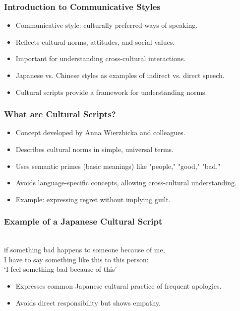 \documentclass[xetex]{beamer}
\begin{document}
\begin{frame}
\frametitle{Introduction to Communicative Styles}
\begin{itemize}
    \item Communicative style: culturally preferred ways of speaking.
    \item Reflects cultural norms, attitudes, and social values.
    \item Important for understanding cross-cultural interactions.
    \item Japanese vs. Chinese styles as examples of indirect vs. direct speech.
    \item Cultural scripts provide a framework for understanding norms.
\end{itemize}
\end{frame}

\begin{frame}
\frametitle{What are Cultural Scripts?}
\begin{itemize}
    \item Concept developed by Anna Wierzbicka and colleagues.
    \item Describes cultural norms in simple, universal terms.
    \item Uses semantic primes (basic meanings) like "people," "good," "bad."
    \item Avoids language-specific concepts, allowing cross-cultural understanding.
    \item Example: expressing regret without implying guilt.
\end{itemize}
\end{frame}

\begin{frame}
\frametitle{Example of a Japanese Cultural Script}
\begin{exe}
     \\
    if something bad happens to someone because of me, \\
    I have to say something like this to this person: \\
    ‘I feel something bad because of this’
\end{exe}
\begin{itemize}
    \item Expresses common Japanese cultural practice of frequent apologies.
    \item Avoids direct responsibility but shows empathy.
\end{itemize}
\end{frame}
\end{document}
